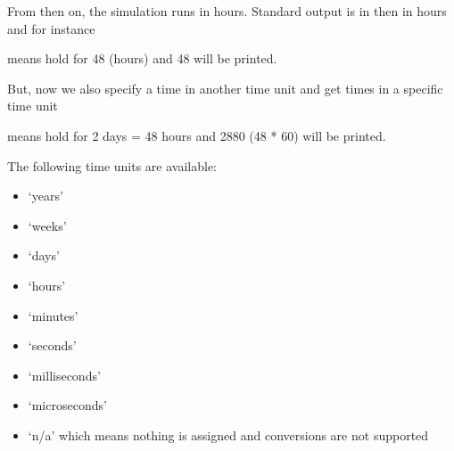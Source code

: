 \documentclass[letterpaper,10pt,english]{sphinxmanual}
\begin{document}
From then on, the simulation runs in hours. Standard output is in then in hours and for instance

\begin{sphinxVerbatim}[commandchars=\\\{\}]
 
  
\end{sphinxVerbatim}

means hold for 48 (hours) and 48 will be printed.

But, now we also specify a time in another time unit and get times in a specific time unit

\begin{sphinxVerbatim}[commandchars=\\\{\}]
 
  
\end{sphinxVerbatim}

means hold for 2 days = 48 hours and 2880 (48 * 60) will be printed.

The following time units are available:
\begin{itemize}
\item {} 
‘years’

\item {} 
‘weeks’

\item {} 
‘days’

\item {} 
‘hours’

\item {} 
‘minutes’

\item {} 
‘seconds’

\item {} 
‘milliseconds’

\item {} 
‘microseconds’

\item {} 
‘n/a’ which means nothing is assigned and conversions are not supported

\end{itemize}
\end{document}

